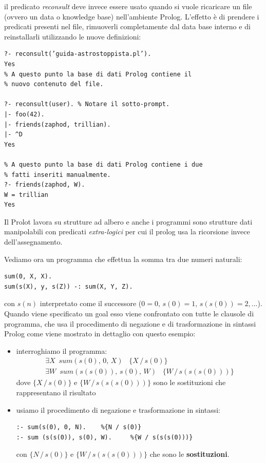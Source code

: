 \documentclass[a4paper]{report}
\begin{document}
il predicato \textit{reconsult} deve invece essere usato quando si vuole ricaricare un file (ovvero un data o knowledge base) nell'ambiente Prolog.
L’effetto è di prendere i predicati presenti nel file, rimuoverli completamente dal data base interno
e di reinstallarli utilizzando le nuove definizioni:
\begin{verbatim}
?- reconsult(’guida-astrostoppista.pl’).
Yes
% A questo punto la base di dati Prolog contiene il
% nuovo contenuto del file.

?- reconsult(user). % Notare il sotto-prompt.
|- foo(42).
|- friends(zaphod, trillian).
|- ^D
Yes

% A questo punto la base di dati Prolog contiene i due
% fatti inseriti manualmente.
?- friends(zaphod, W).
W = trillian
Yes
\end{verbatim}

Il Prolot lavora su strutture ad albero e anche i programmi sono strutture dati manipolabili con predicati \textit{extra-logici}
per cui il prolog usa la ricorsione invece dell'assegnamento.

Vediamo ora un programma che effettua la somma tra due numeri naturali:
\begin{verbatim}
sum(0, X, X).
sum(s(X), y, s(Z)) -: sum(X, Y, Z).
\end{verbatim}
con $s(n)$ interpretato come il successore ($0=0,\, s(0)=1, \,s(s(0))=2,... $).\newline
Quando viene specificato un goal esso viene confrontato con tutte le clausole di programma, che usa il procedimento di negazione
e di trasformazione in sintassi Prolog come viene mostrato in dettaglio con questo esempio:
\begin{itemize}
\item  interroghiamo il programma:
  \begin{equation*}
  \begin{split}
    \exists X\,\,\, sum(s(0),\, 0,\, X)\,\,\,\,\,\{X\,/\, s(0)\} \\
    \exists W\,\,\, sum(s(s(0)),\, s(0), \, W)\,\,\,\,\,\{W\,/\, s(s(s(0)))\}
  \end{split}
  \end{equation*}
dove $\{X\,/\, s(0)\}$ e $\{W\,/\, s(s(s(0)))\}$ sono le sostituzioni che rappresentano il risultato
\item usiamo il procedimento di negazione e trasformazione in sintassi:
\begin{verbatim}
:- sum(s(0), 0, N).    %{N / s(0)}
:- sum (s(s(0)), s(0), W).     %{W / s(s(s(0)))}
\end{verbatim}
con $\{N\, /\, s(0)\}$ e $\{W \,/\, s(s(s(0)))\}$ che sono le \textbf{sostituzioni}.
\end{itemize}
\end{document}
